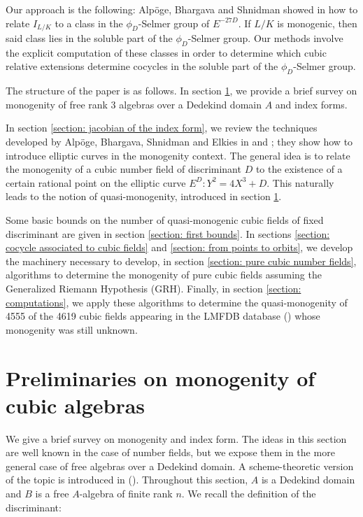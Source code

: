 \documentclass[oneside]{amsart}
\theoremstyle{definition}
\begin{document}
Our approach is the following: Alpöge, Bhargava and Shnidman showed in \cite{Bhargava} how to relate $I_{L/K}$ to a class in the $\phi_D$-Selmer group of $E^{-27D}$. If $L/K$ is monogenic, then said class lies in the soluble part of the $\phi_D$-Selmer group. Our methods involve the explicit computation of these classes in order to determine which cubic relative extensions determine cocycles in the soluble part of the $\phi_D$-Selmer group. 

The structure  of the paper is as  follows. In section \ref{section: preliminaries}, we provide a brief survey on monogenity of free rank 3 algebras over a Dedekind domain $A$ and index forms. 

In section \ref{section: jacobian of the index form}, we review the techniques developed by Alpöge, Bhargava, Shnidman and Elkies in \cite{Bhargava} and \cite{Bhargava_2019}; they  show how to introduce  elliptic curves in the monogenity context. The general idea is to relate the monogenity of a cubic number field of discriminant $D$ to the existence of a certain rational point on the elliptic curve $E^{D}:Y^2 = 4X^3 + D$. This  naturally leads to the notion of quasi-monogenity, introduced in section \ref{section: preliminaries}. 

Some basic bounds on the number of quasi-monogenic cubic  fields of fixed discriminant are given  in section \ref{section: first bounds}. In sections \ref{section: cocycle associated to cubic fields} and \ref{section: from points to orbits}, we develop the machinery necessary to develop, in section    \ref{section: pure cubic number fields},  algorithms to determine the monogenity of pure cubic fields assuming the Generalized Riemann Hypothesis (GRH). Finally, in section \ref{section: computations}, we apply these algorithms to determine the quasi-monogenity of 4555 of the 4619 cubic fields appearing in the LMFDB database (\cite{lmfdb}) whose monogenity was still unknown.


\section{Preliminaries on monogenity of cubic algebras}
\label{section: preliminaries}
We give a brief survey on monogenity and index form. The ideas in this section are well known in the case of number fields, but we expose them in the more general case of free algebras over a Dedekind domain.   A scheme-theoretic version of the topic is introduced in  (\cite[Def. 1.2]{ArpinI}). Throughout this section, $A$ is a Dedekind domain and $B$ is a  free $A$-algebra of finite rank $n$. We recall the definition of the discriminant: 
\end{document}
